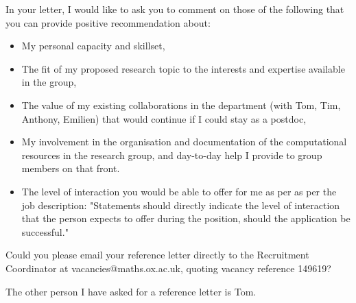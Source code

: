 \documentclass[12pt]{article}
\begin{document}
In your letter, I would like to ask you to comment on those of the following that you can provide positive recommendation about:
\begin{itemize}
\item My personal capacity and skillset,
\item The fit of my proposed research topic to the interests and expertise available in the group,
\item The value of my existing collaborations in the department (with Tom, Tim, Anthony, Emilien) that would continue if I could stay as a postdoc,
\item My involvement in the organisation and documentation of the computational resources in the research group, and day-to-day help I provide to group members on that front.
\item The level of interaction you would be able to offer for me as per as per the job description: 
"Statements should directly indicate the level of interaction that the person expects to offer during the position, should the application be successful."
\end{itemize}

Could you please email your reference letter directly to the Recruitment Coordinator at vacancies@maths.ox.ac.uk, quoting vacancy reference 149619?

The other person I have asked for a reference letter is Tom.
\end{document}
